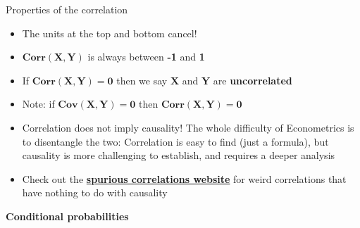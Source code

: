 \documentclass[
  ignorenonframetext,
  aspectratio=169]{beamer}
\providecommand{\tightlist}{%
  \setlength{\itemsep}{0pt}\setlength{\parskip}{0pt}}
\begin{document}
\begin{frame}{Properties of the correlation}
\protect\hypertarget{properties-of-the-correlation}{}
\begin{itemize}
\tightlist
\item
  The units at the top and bottom cancel!
\item
  \(\bm{Corr(X,Y)}\) is always between \textbf{-1} and \textbf{1}
\item
  If \(\bm{Corr(X,Y)=0}\) then we say \(\bm{X}\) and \(\bm{Y}\) are
  \textbf{uncorrelated}
\item
  Note: if \(\bm{Cov(X,Y)=0}\) then \(\bm{Corr(X,Y)=0}\)
\item
  Correlation does not imply causality! The whole difficulty of
  Econometrics is to disentangle the two: Correlation is easy to find
  (just a formula), but causality is more challenging to establish, and
  requires a deeper analysis
\item
  Check out the
  \href{https://www.tylervigen.com/spurious-correlations}{\textbf{spurious correlations website}}
  for weird correlations that have nothing to do with causality
\end{itemize}
\end{frame}

\begin{frame}{}
\protect\hypertarget{section-1}{}
\begin{center} \label{condrv}
\LARGE{ \textbf{Conditional probabilities} } 
\end{center}
\end{frame}
\end{document}
